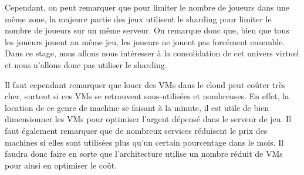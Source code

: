 Cependant, on peut remarquer que pour limiter le nombre de joueurs dans une même zone, la majeure partie des jeux utilisent le sharding pour limiter le nombre de joueurs sur un même serveur.
On remarque donc que, bien que tous les joueurs jouent au même jeu, les joueurs ne jouent pas forcément ensemble.
Dans ce stage, nous allons nous intéresser à la consolidation de cet univers virtuel et nous n'allons donc pas utiliser le sharding.

Il faut cependant remarquer que louer des VMs dans le cloud peut coûter très cher, surtout si ces VMs se retrouvent sous-utilisées et nombreuses.
En effet, la location de ce genre de machine se faisant à la minute, il est utile de bien dimensionner les VMs pour optimiser l'argent dépensé dans le serveur de jeu.
Il faut également remarquer que de nombreux services réduisent le prix des machines si elles sont utilisées plus qu'un certain pourcentage dans le mois.
Il faudra donc faire en sorte que l'architecture utilise un nombre réduit de VMs pour ainsi en optimiser le coût.


